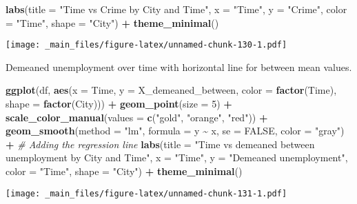 \documentclass[
]{book}
\newenvironment{Shaded}{\begin{snugshade}}{\end{snugshade}}
\newcommand{\AttributeTok}[1]{\textcolor[rgb]{0.13,0.29,0.53}{#1}}
\newcommand{\CommentTok}[1]{\textcolor[rgb]{0.56,0.35,0.01}{\textit{#1}}}
\newcommand{\ConstantTok}[1]{\textcolor[rgb]{0.56,0.35,0.01}{#1}}
\newcommand{\DecValTok}[1]{\textcolor[rgb]{0.00,0.00,0.81}{#1}}
\newcommand{\FunctionTok}[1]{\textcolor[rgb]{0.13,0.29,0.53}{\textbf{#1}}}
\newcommand{\NormalTok}[1]{#1}
\newcommand{\SpecialCharTok}[1]{\textcolor[rgb]{0.81,0.36,0.00}{\textbf{#1}}}
\newcommand{\StringTok}[1]{\textcolor[rgb]{0.31,0.60,0.02}{#1}}
\begin{document}
\begin{Shaded}
\begin{Highlighting}[]
  \FunctionTok{labs}\NormalTok{(}\AttributeTok{title =} \StringTok{"Time vs Crime by City and Time"}\NormalTok{,}
       \AttributeTok{x =} \StringTok{"Time"}\NormalTok{,}
       \AttributeTok{y =} \StringTok{"Crime"}\NormalTok{,}
       \AttributeTok{color =} \StringTok{"Time"}\NormalTok{,}
       \AttributeTok{shape =} \StringTok{"City"}\NormalTok{) }\SpecialCharTok{+}
  \FunctionTok{theme\_minimal}\NormalTok{()}
\end{Highlighting}
\end{Shaded}

\texttt{[image: \_main\_files/figure-latex/unnamed-chunk-130-1.pdf]}

Demeaned unemployment over time with horizontal line for between mean values.

\begin{Shaded}
\begin{Highlighting}[]
\FunctionTok{ggplot}\NormalTok{(df, }\FunctionTok{aes}\NormalTok{(}\AttributeTok{x =}\NormalTok{ Time, }\AttributeTok{y =}\NormalTok{ X\_demeaned\_between, }\AttributeTok{color =} \FunctionTok{factor}\NormalTok{(Time), }\AttributeTok{shape =} \FunctionTok{factor}\NormalTok{(City))) }\SpecialCharTok{+}
  \FunctionTok{geom\_point}\NormalTok{(}\AttributeTok{size =} \DecValTok{5}\NormalTok{) }\SpecialCharTok{+}
  \FunctionTok{scale\_color\_manual}\NormalTok{(}\AttributeTok{values =} \FunctionTok{c}\NormalTok{(}\StringTok{"gold"}\NormalTok{, }\StringTok{"orange"}\NormalTok{, }\StringTok{"red"}\NormalTok{)) }\SpecialCharTok{+}
  \FunctionTok{geom\_smooth}\NormalTok{(}\AttributeTok{method =} \StringTok{"lm"}\NormalTok{, }\AttributeTok{formula =}\NormalTok{ y }\SpecialCharTok{\textasciitilde{}}\NormalTok{ x, }\AttributeTok{se =} \ConstantTok{FALSE}\NormalTok{, }\AttributeTok{color =} \StringTok{"gray"}\NormalTok{) }\SpecialCharTok{+}  \CommentTok{\# Adding the regression line}
  \FunctionTok{labs}\NormalTok{(}\AttributeTok{title =} \StringTok{"Time vs demeaned between unemployment by City and Time"}\NormalTok{,}
       \AttributeTok{x =} \StringTok{"Time"}\NormalTok{,}
       \AttributeTok{y =} \StringTok{"Demeaned unemployment"}\NormalTok{,}
       \AttributeTok{color =} \StringTok{"Time"}\NormalTok{,}
       \AttributeTok{shape =} \StringTok{"City"}\NormalTok{) }\SpecialCharTok{+}
  \FunctionTok{theme\_minimal}\NormalTok{()}
\end{Highlighting}
\end{Shaded}

\texttt{[image: \_main\_files/figure-latex/unnamed-chunk-131-1.pdf]}
\end{document}
